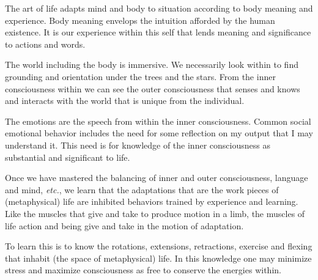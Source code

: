 

The art of life adapts mind and body to situation according to body
meaning and experience.  Body meaning envelops the intuition afforded
by the human existence.  It is our experience within this self that
lends meaning and significance to actions and words.  

The world including the body is immersive.  We necessarily look within
to find grounding and orientation under the trees and the stars.  From
the inner consciousness within we can see the outer consciousness that
senses and knows and interacts with the world that is unique from the
individual.

The emotions are the speech from within the inner consciousness.
Common social emotional behavior includes the need for some reflection
on my output that I may understand it.  This need is for knowledge of
the inner consciousness as substantial and significant to life.

Once we have mastered the balancing of inner and outer consciousness,
language and mind, {\it etc.}, we learn that the adaptations that are
the work pieces of (metaphysical) life are inhibited behaviors trained
by experience and learning.  Like the muscles that give and take to
produce motion in a limb, the muscles of life action and being give
and take in the motion of adaptation.

To learn this is to know the rotations, extensions, retractions,
exercise and flexing that inhabit (the space of metaphysical) life.
In this knowledge one may minimize stress and maximize consciousness
as free to conserve the energies within.

\bye

